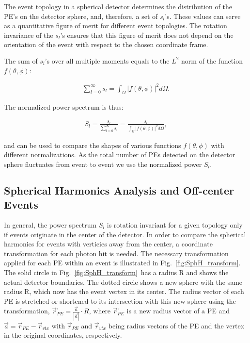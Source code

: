 The event topology in a spherical detector determines the distribution
of the PE's on the detector sphere, and, therefore, a set of
$s_l$'s. These values can serve as a quantitative figure of merit for
different event topologies. The rotation invariance of the $s_l$'s ensures
that this figure of merit does not depend on the orientation of the
event with respect to the chosen coordinate frame.

The sum of $s_l$'s over all multiple moments equals to the $L^2$ norm of the
function $f(\theta,\phi)$:

\begin{eqnarray}
\label{eq5}
\sum_{l=0}^{\infty} s_l = \int_{\Omega} |f(\theta,\phi)|^2 d\Omega.
\end{eqnarray}

The normalized power spectrum is thus:

\begin{eqnarray}
\label{eq6}
S_l = \frac{s_l}{\sum_{l=0}^{\infty} s_l} =  \frac{s_l}{\int_{\Omega} |f(\theta,\phi)|^2 d\Omega},
\end{eqnarray}

and can be used to compare the shapes of various functions
$f(\theta,\phi)$ with different normalizations. As the total number of
PEs detected on the detector sphere fluctuates from event to event we
use the normalized power $S_l$.


\subsection{Spherical Harmonics Analysis and Off-center Events}

In general, the power spectrum $S_l$ is rotation invariant for a given
topology only if events originate in the center of the detector. In
order to compare the spherical harmonics for events with verticies away
from the center, a coordinate transformation for each photon hit is
needed. The necessary transformation applied for each PE within an
event is illustrated in Fig.~\ref{fig:SphH_transform}.  The solid
circle in Fig.~\ref{fig:SphH_transform}~has a radius R and shows the
actual detector boundaries. The dotted circle shows a new sphere with
the same radius R, which now has the event vertex in its center. The
radius vector of each PE is stretched or shortened to its intersection
with this new sphere using the transformation, $\vec{r}^{,}_{PE} =
\frac{\vec{a}}{|\vec{a}|} \cdot R$, where $\vec{r}^{,}_{PE}$ is a new
radius vector of a PE and $\vec{a}=\vec{r}_{PE} - \vec{r}_{vtx}$ with
$\vec{r}_{PE}$ and $\vec{r}_{vtx}$ being radius vectors of the PE and
the vertex in the original coordinates, respectively.

